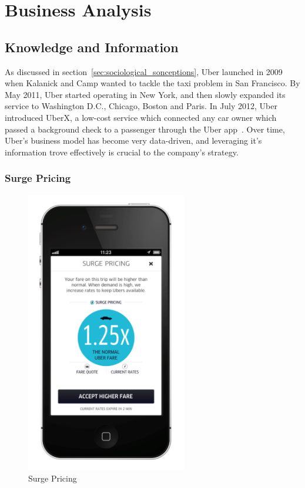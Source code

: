 \chapter{Business Analysis}\label{chap:business_analysis}

  \section{Knowledge and Information}\label{sec:knowledge_and_information}

    As discussed in section~\ref{sec:sociological_sonceptions}, Uber launched in 2009 when Kalanick and Camp wanted to tackle the taxi problem in San Francisco. By May 2011, Uber started operating in New York, and then slowly expanded its service to Washington D.C., Chicago, Boston and Paris. In July 2012, Uber introduced UberX, a low-cost service which connected any car owner which passed a background check to a passenger through the Uber app~\parencite{haider2015}. Over time, Uber's business model has become very data-driven, and leveraging it's information trove effectively is crucial to the company's strategy.

      \subsection{Surge Pricing}\label{subsec:surge_pricing}

        \begin{figure}
          \centering
          \begin{minipage}{7cm}
            \centering
            \includegraphics[width=7cm]{inc/surge_pricing.png}
            \caption[Surge Pricing]{Surge Pricing~\parencite{uber2013}}
            \label{fig:surge_pricing}
          \end{minipage}
        \end{figure}

